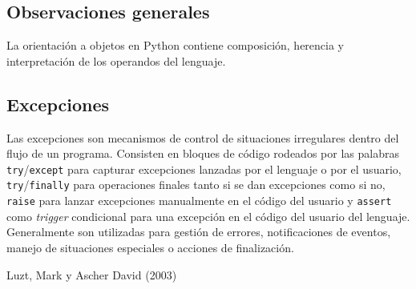 \documentclass[12pt]{article} %
\begin{document}
\subsection{Observaciones generales}
La orientación a objetos en Python contiene composición, herencia y interpretación de los operandos del lenguaje.
\subsection{Excepciones}
Las excepciones son mecanismos de control de situaciones irregulares dentro del flujo de un programa. Consisten en bloques de código rodeados por las palabras \verb+try+/\verb+except+ para capturar excepciones lanzadas por el lenguaje o por el usuario, \verb+try+/\verb+finally+ para operaciones finales tanto si se dan excepciones como si no, \verb+raise+ para lanzar excepciones manualmente en el código del usuario y \verb+assert+ como \textit{trigger} condicional para una excepción en el código del usuario del lenguaje. Generalmente son utilizadas para gestión de errores, notificaciones de eventos, manejo de situaciones especiales o acciones de finalización.


\begin{thebibliography}{99} %

Luzt, Mark y Ascher David (2003)
 
\end{thebibliography}

\end{document}

